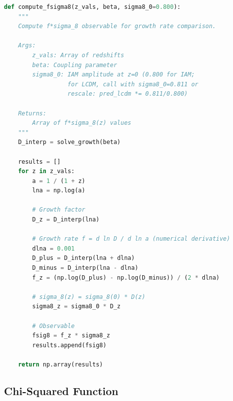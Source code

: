 \documentclass[11pt]{article}
\begin{document}
\begin{lstlisting}[language=Python]
def compute_fsigma8(z_vals, beta, sigma8_0=0.800):
    """
    Compute f*sigma_8 observable for growth rate comparison.
    
    Args:
        z_vals: Array of redshifts
        beta: Coupling parameter
        sigma8_0: IAM amplitude at z=0 (0.800 for IAM; 
                  for LCDM, call with sigma8_0=0.811 or
                  rescale: pred_lcdm *= 0.811/0.800)
    
    Returns:
        Array of f*sigma_8(z) values
    """
    D_interp = solve_growth(beta)
    
    results = []
    for z in z_vals:
        a = 1 / (1 + z)
        lna = np.log(a)
        
        # Growth factor
        D_z = D_interp(lna)
        
        # Growth rate f = d ln D / d ln a (numerical derivative)
        dlna = 0.001
        D_plus = D_interp(lna + dlna)
        D_minus = D_interp(lna - dlna)
        f_z = (np.log(D_plus) - np.log(D_minus)) / (2 * dlna)
        
        # sigma_8(z) = sigma_8(0) * D(z)
        sigma8_z = sigma8_0 * D_z
        
        # Observable
        fsig8 = f_z * sigma8_z
        results.append(fsig8)
    
    return np.array(results)
\end{lstlisting}

\subsection{Chi-Squared Function}
\end{document}
